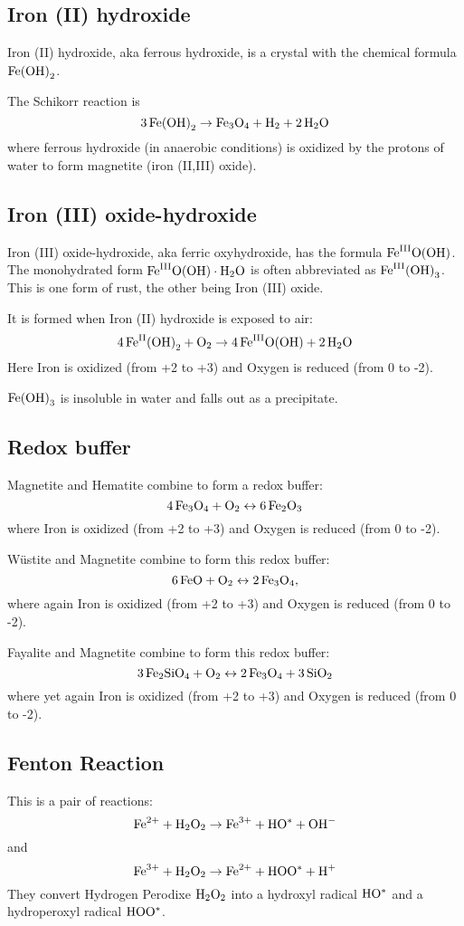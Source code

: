 \documentclass[a4paper,14pt]{extarticle}
\def\H{{\rm H}}
\def\O{{\rm O}}
\def\Fe{{\rm Fe}}
\def\Si{{\rm Si}}
\def\II{{\rm II}}
\def\III{{\rm III}}
\begin{document}
\subsection{Iron (II) hydroxide}
Iron (II) hydroxide, aka ferrous hydroxide, is a crystal with the chemical formula $\Fe{(\O\H)}_2$.

The Schikorr reaction is
\[
    3 \,\Fe {(\O\H)}_2 \rightarrow \Fe_3\O_4 + \H_2 + 2\,\H_2\O
\]
where ferrous hydroxide (in anaerobic conditions) is oxidized by the protons of water to form magnetite (iron (II,III)
oxide).

\subsection{Iron (III) oxide-hydroxide}
Iron (III) oxide-hydroxide, aka ferric oxyhydroxide, has the formula $\Fe^\III\O(\O\H)$. The monohydrated form
$\Fe^\III\O(\O\H)\cdot \H_2\O$ is often abbreviated as $\Fe^\III{(\O\H)}_3$. This is one form of rust, the other being
Iron (III) oxide.

It is formed when Iron (II) hydroxide is exposed to air:
\[
    4 \,\Fe^\II{(\O\H)}_2 + \O_2 \rightarrow 4 \,\Fe^\III\O(\O\H) + 2 \,\H_2\O
\]
Here Iron is oxidized (from +2 to +3) and Oxygen is reduced (from 0 to -2).

$\Fe{(\O\H)}_3$ is insoluble in water and falls out as a precipitate.

\subsection{Redox buffer}
Magnetite and Hematite combine to form a redox buffer:
\[
    4 \,\Fe_3\O_4 + \O_2 \leftrightarrow 6\, \Fe_2\O_3
\]
where Iron is oxidized (from +2 to +3) and Oxygen is reduced (from 0 to -2).

Wüstite and Magnetite combine to form this redox buffer:
\[
    6 \,\Fe\O + \O_2 \leftrightarrow 2\,\Fe_3\O_4,
\]
where again Iron is oxidized (from +2 to +3) and Oxygen is reduced (from 0 to -2).

Fayalite and Magnetite combine to form this redox buffer:
\[
    3 \,\Fe_2\Si\O_4 + \O_2 \leftrightarrow 2 \,\Fe_3\O_4 + 3 \,\Si\O_2
\]
where yet again Iron is oxidized (from +2 to +3) and Oxygen is reduced (from 0 to -2).

\subsection{Fenton Reaction}
This is a pair of reactions:
\[
    \Fe^{2+} + \H_2\O_2 \rightarrow \Fe^{3+} + \H\O^{*} + \O\H^-
\]
and
\[
    \Fe^{3+} + \H_2\O_2 \rightarrow \Fe^{2+} + \H\O\O^{*} + \H^+
\]
They convert Hydrogen Perodixe $\H_2\O_2$ into a hydroxyl radical $\H\O^*$ and a hydroperoxyl radical
$\H\O\O^*$.
\end{document}
